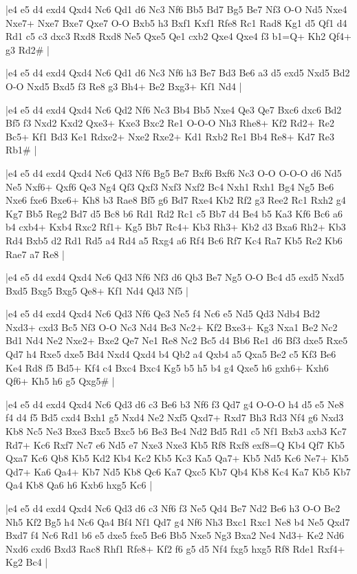 \whitename{}
\blackname{}
\makegametitle
|e4 e5 d4 exd4 Qxd4 Nc6 Qd1 d6 Nc3 Nf6 Bb5 Bd7 Bg5 Be7 Nf3 O-O Nd5 Nxe4 Nxe7+ Nxe7 Bxe7 Qxe7 O-O Bxb5 h3 Bxf1 Kxf1 Rfe8 Rc1 Rad8 Kg1 d5 Qf1 d4 Rd1 c5 c3 dxc3 Rxd8 Rxd8 Ne5 Qxe5 Qe1 cxb2 Qxe4 Qxe4 f3 b1=Q+ Kh2 Qf4+ g3 Rd2\#  |

\whitename{}
\blackname{}
\makegametitle
|e4 e5 d4 exd4 Qxd4 Nc6 Qd1 d6 Nc3 Nf6 h3 Be7 Bd3 Be6 a3 d5 exd5 Nxd5 Bd2 O-O Nxd5 Bxd5 f3 Re8 g3 Bh4+ Be2 Bxg3+ Kf1 Nd4  |

\whitename{}
\blackname{}
\makegametitle
|e4 e5 d4 exd4 Qxd4 Nc6 Qd2 Nf6 Nc3 Bb4 Bb5 Nxe4 Qe3 Qe7 Bxc6 dxc6 Bd2 Bf5 f3 Nxd2 Kxd2 Qxe3+ Kxe3 Bxc2 Re1 O-O-O Nh3 Rhe8+ Kf2 Rd2+ Re2 Bc5+ Kf1 Bd3 Ke1 Rdxe2+ Nxe2 Rxe2+ Kd1 Rxb2 Re1 Bb4 Re8+ Kd7 Re3 Rb1\#  |

\whitename{}
\blackname{}
\makegametitle
|e4 e5 d4 exd4 Qxd4 Nc6 Qd3 Nf6 Bg5 Be7 Bxf6 Bxf6 Nc3 O-O O-O-O d6 Nd5 Ne5 Nxf6+ Qxf6 Qe3 Ng4 Qf3 Qxf3 Nxf3 Nxf2 Bc4 Nxh1 Rxh1 Bg4 Ng5 Be6 Nxe6 fxe6 Bxe6+ Kh8 b3 Rae8 Bf5 g6 Bd7 Rxe4 Kb2 Rf2 g3 Ree2 Rc1 Rxh2 g4 Kg7 Bb5 Reg2 Bd7 d5 Bc8 b6 Rd1 Rd2 Rc1 c5 Bb7 d4 Be4 b5 Ka3 Kf6 Bc6 a6 b4 cxb4+ Kxb4 Rxc2 Rf1+ Kg5 Bb7 Rc4+ Kb3 Rh3+ Kb2 d3 Bxa6 Rh2+ Kb3 Rd4 Bxb5 d2 Rd1 Rd5 a4 Rd4 a5 Rxg4 a6 Rf4 Bc6 Rf7 Kc4 Ra7 Kb5 Re2 Kb6 Rae7 a7 Re8  |

\whitename{}
\blackname{}
\makegametitle
|e4 e5 d4 exd4 Qxd4 Nc6 Qd3 Nf6 Nf3 d6 Qb3 Be7 Ng5 O-O Bc4 d5 exd5 Nxd5 Bxd5 Bxg5 Bxg5 Qe8+ Kf1 Nd4 Qd3 Nf5  |

\whitename{}
\blackname{}
\makegametitle
|e4 e5 d4 exd4 Qxd4 Nc6 Qd3 Nf6 Qe3 Ne5 f4 Nc6 e5 Nd5 Qd3 Ndb4 Bd2 Nxd3+ cxd3 Bc5 Nf3 O-O Nc3 Nd4 Be3 Nc2+ Kf2 Bxe3+ Kg3 Nxa1 Be2 Nc2 Bd1 Nd4 Ne2 Nxe2+ Bxe2 Qe7 Ne1 Re8 Nc2 Bc5 d4 Bb6 Re1 d6 Bf3 dxe5 Rxe5 Qd7 h4 Rxe5 dxe5 Bd4 Nxd4 Qxd4 b4 Qb2 a4 Qxb4 a5 Qxa5 Be2 c5 Kf3 Be6 Ke4 Rd8 f5 Bd5+ Kf4 c4 Bxc4 Bxc4 Kg5 b5 h5 b4 g4 Qxe5 h6 gxh6+ Kxh6 Qf6+ Kh5 h6 g5 Qxg5\#  |

\whitename{}
\blackname{}
\makegametitle
|e4 e5 d4 exd4 Qxd4 Nc6 Qd3 d6 c3 Be6 b3 Nf6 f3 Qd7 g4 O-O-O h4 d5 e5 Ne8 f4 d4 f5 Bd5 cxd4 Bxh1 g5 Nxd4 Ne2 Nxf5 Qxd7+ Rxd7 Bh3 Rd3 Nf4 g6 Nxd3 Kb8 Nc5 Ne3 Bxe3 Bxc5 Bxc5 b6 Be3 Be4 Nd2 Bd5 Rd1 c5 Nf1 Bxb3 axb3 Kc7 Rd7+ Kc6 Rxf7 Nc7 e6 Nd5 e7 Nxe3 Nxe3 Kb5 Rf8 Rxf8 exf8=Q Kb4 Qf7 Kb5 Qxa7 Kc6 Qb8 Kb5 Kd2 Kb4 Kc2 Kb5 Kc3 Ka5 Qa7+ Kb5 Nd5 Kc6 Ne7+ Kb5 Qd7+ Ka6 Qa4+ Kb7 Nd5 Kb8 Qc6 Ka7 Qxc5 Kb7 Qb4 Kb8 Kc4 Ka7 Kb5 Kb7 Qa4 Kb8 Qa6 h6 Kxb6 hxg5 Kc6  |

\whitename{}
\blackname{}
\makegametitle
|e4 e5 d4 exd4 Qxd4 Nc6 Qd3 d6 c3 Nf6 f3 Ne5 Qd4 Be7 Nd2 Be6 h3 O-O Be2 Nh5 Kf2 Bg5 h4 Nc6 Qa4 Bf4 Nf1 Qd7 g4 Nf6 Nh3 Bxc1 Rxc1 Ne8 b4 Ne5 Qxd7 Bxd7 f4 Nc6 Rd1 b6 e5 dxe5 fxe5 Be6 Bb5 Nxe5 Ng3 Bxa2 Ne4 Nd3+ Ke2 Nd6 Nxd6 cxd6 Bxd3 Rac8 Rhf1 Rfe8+ Kf2 f6 g5 d5 Nf4 fxg5 hxg5 Rf8 Rde1 Rxf4+ Kg2 Bc4  |


